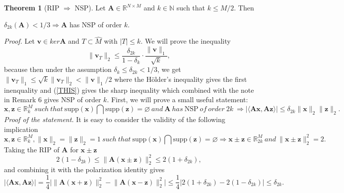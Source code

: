 \documentclass[11pt,oneside,czech,american]{book} %
\theoremstyle{definition} %
\newtheorem{thm}{Theorem}
\theoremstyle{definition}
\begin{document}
\begin{thm}[RIP $\Rightarrow$ NSP]
	Let $\bm{A} \in \mathbb{R}^{N \times M}$ and $k \in \mathbb{N}$ such that $k \leq M/2$. Then
	\begin{center}
		$\delta_{2k}(\bm{A}) < 1/3 \Rightarrow \bm{A}$ has NSP of order $k$.
	\end{center}
	
\end{thm}
\emph{Proof.} Let $\bm{v} \in ker \bm{A}$ and $T \subset \hat{M}$ with $|T| \leq k$. We will prove the inequality
\begin{equation}
	\lVert \bm{v}_T\rVert_{2} \leq \frac{\delta_{2k}}{1-\delta_{k}} \cdot \frac{\lVert \bm{v} \rVert_{1}}{\sqrt{k}}, \label{THIS}
\end{equation}
because then under the assumption $\delta_{k} \leq \delta_{2k} < 1/3$, we get $\lVert \bm{v}_T \rVert_1 \leq \sqrt k\lVert \bm{v}_T \rVert_2 < \lVert \bm{v} \rVert_1 /2$ where the Hölder's inequality gives the first inenquality and (\ref{THIS}) gives the sharp inequality which combined with the note in Remark 6 gives NSP of order $k$.
\newline
\newline
First, we will prove a small useful statement:
\small
\begin{equation}
\bm{x},\bm{z} \in \mathbb{R}^{M}_k \ such \ that \ \text{supp}(\bm{x}) \bigcap \text{supp}(\bm{z}) = \varnothing \ and \ \bm{A} \ has \ \text{NSP} \ of \ order \ 2k \ \Rightarrow |\langle\bm{Ax},\bm{Az}\rangle| \leq \delta_{2k} \lVert \bm{x} \rVert_2 \lVert \bm{z} \rVert_2. \label{statement}
\end{equation}
\normalsize
\emph{Proof of the statement.} It is easy to consider the validity of the following implication
\small
\begin{equation}
\bm{x},\bm{z} \in \mathbb{R}^{M}_k, \lVert \bm{x} \rVert_2 = \lVert \bm{z} \rVert_2 = 1 \ such \ that \ \text{supp}(\bm{x}) \bigcap \text{supp}(\bm{z}) = \varnothing \Rightarrow \bm{x} \pm \bm{z} \in \mathbb{R}^{M}_{2k} \ and \ \lVert \bm{x} \pm \bm{z} \rVert_2^2 = 2.
\end{equation}
\normalsize
Taking the RIP of $\bm{A}$ for $\bm{x} \pm \bm{z}$
\begin{equation*}
	2(1-\delta_{2k})\leq \lVert\bm{A}( \bm{\bm{x} \pm \bm{z}})\rVert_{2}^2 \leq 2(1+\delta_{2k}),
\end{equation*}
and combining it with the polarization identity gives
\begin{equation*}
	|\langle\bm{Ax},\bm{Az}\rangle| = \frac{1}{4} \Big|\lVert \bm{A}(\bm{x}+\bm{z})\rVert_2^{2} - \lVert \bm{A}(\bm{x}-\bm{z})\rVert_2^{2}\Big|\leq \frac{1}{4} \Big| 2(1+\delta_{2k}) - 2(1-\delta_{2k})\Big| \leq \delta_{2k}.
\end{equation*}
\end{document}
